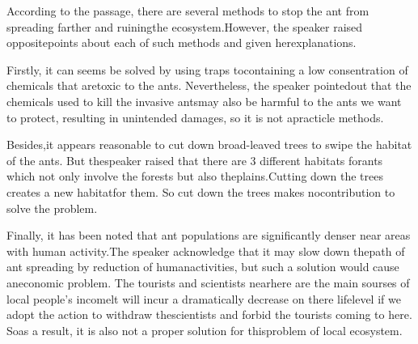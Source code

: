 \documentclass[a4paper, 10pt]{article}
\begin{document}
According to the passage, there are several methods to stop the ant from spreading farther and ruiningthe ecosystem.However, the speaker raised oppositepoints about each of such methods and given herexplanations.

Firstly, it can seems be solved by using traps tocontaining a low consentration of chemicals that aretoxic to the ants. Nevertheless, the speaker pointedout that the chemicals used to kill the invasive antsmay also be harmful to the ants we want to protect, resulting in unintended damages, so it is not apracticle methods.

Besides,it appears reasonable to cut down broad-leaved trees to swipe the habitat of the ants. But thespeaker raised that there are 3 different habitats forants which not only involve the forests but also theplains.Cutting down the trees creates a new habitatfor them. So cut down the trees makes nocontribution to solve the problem.

Finally, it has been noted that ant populations are significantly denser near areas with human activity.The speaker acknowledge that it may slow down thepath of ant spreading by reduction of humanactivities, but such a solution would cause aneconomic problem. The tourists and scientists nearhere are the main sourses of local people's incomelt will incur a dramatically decrease on there lifelevel if we adopt the action to withdraw thescientists and forbid the tourists coming to here. Soas a result, it is also not a proper solution for thisproblem of local ecosystem.
\end{document}
